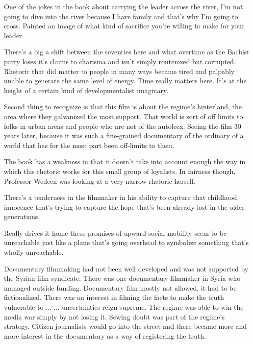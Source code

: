\documentclass{article}
\begin{document}
\vspace{5mm}

One of the jokes in the book about carrying the leader across the river, I'm not going to dive into the river because I have family and that's why I'm going to cross.  Painted an image of what kind of sacrifice you're willing to make for your leader.  

\vspace{5mm}

There's a big a shift between the seventies here and what overtime as the Bachist party loses it's claims to charisma and isn't simply routenized but corrupted.  Rhetoric that did matter to people in many ways became tired and palpably unable to generate the same level of energy.  Time really matters here.  It's at the height of a certain kind of developmentalist imaginary.  

\vspace{5mm}

Second thing to recognize is that this film is about the regime's hinterland, the area where they galvanized the most support.  That world is sort of off limits to folks in urban areas and people who are not of the autoleex.  Seeing the film 30 years later, because it was such a fine-grained documentary of the ordinary of a world that has for the most part been off-limits to them.  

\vspace{5mm}

The book has a weakness in that it doesn't take into account enough the way in which this rhetoric works for this small group of loyalists.  In fairness though, Professor Wedeen was looking at a very narrow rhetoric herself.  

\vspace{5mm}

There's a tenderness in the filmmaker in his ability to capture that childhood innocence that's trying to capture the hope that's been already lost in the older generations.  

\vspace{5mm}

Really drives it home these promises of upward social mobility seem to be unreachable just like a plane that's going overhead to symbolize something that's wholly unreachable.  

\vspace{5mm}

Documentary filmmaking had not been well developed and was not supported by the Syrian film syndicate.  There was one documentary filmmaker in Syria who managed outside funding.  Documentary film mostly not allowed, it had to be fictionalized.  There was an interest in filming the facts to make the truth vulnerable to ... ... uncertainties reign supreme.  The regime was able to win the media war simply by not losing it.  Sewing doubt was part of the regime's strategy.  Citizen journalists would go into the street and there became more and more interest in the documentary as a way of registering the truth.  
\end{document}
